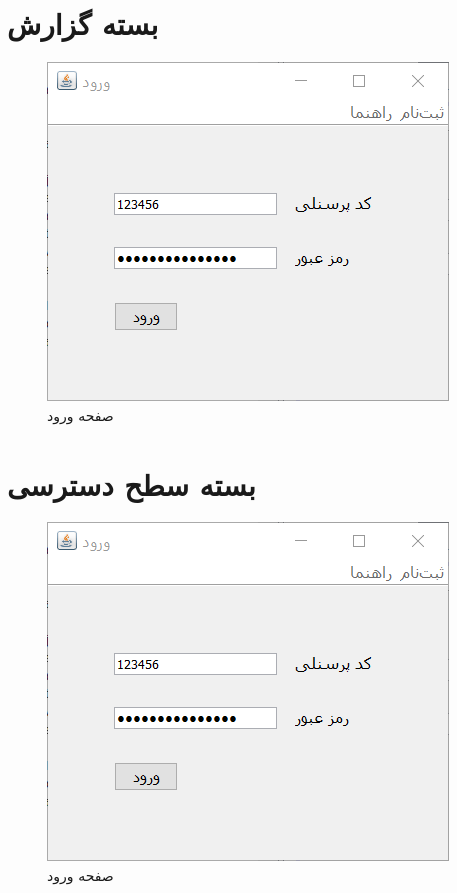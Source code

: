 \section{بسته گزارش}
\begin{figure}[H]
	\centering
	\includegraphics[scale=0.8]{img/prot/LoginForm}
	\caption{صفحه ورود}
\end{figure}

\section{بسته سطح دسترسی}
\begin{figure}[H]
	\centering
	\includegraphics[scale=0.8]{img/prot/LoginForm}
	\caption{صفحه ورود}
\end{figure}


